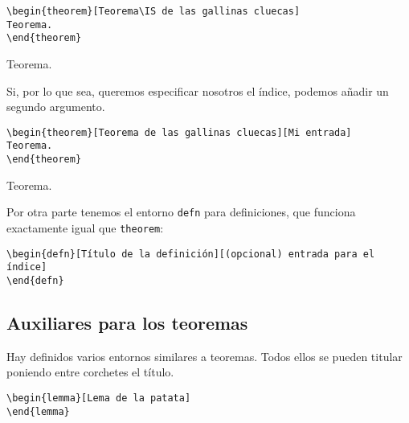 \documentclass[nochap]{apuntes}
\begin{document}
\begin{verbatim}
\begin{theorem}[Teorema\IS de las gallinas cluecas]
Teorema.
\end{theorem}
\end{verbatim}

\begin{theorem}
Teorema.
\end{theorem}

Si, por lo que sea, queremos especificar nosotros el índice, podemos añadir un segundo argumento.

\begin{verbatim}
\begin{theorem}[Teorema de las gallinas cluecas][Mi entrada]
Teorema.
\end{theorem}
\end{verbatim}

\begin{theorem}
Teorema.
\end{theorem}

Por otra parte tenemos el entorno \texttt{defn} para definiciones, que funciona exactamente igual que \texttt{theorem}:

\begin{verbatim}
\begin{defn}[Título de la definición][(opcional) entrada para el índice]
\end{defn}
\end{verbatim}

\begin{defn}
\end{defn}

\subsection{Auxiliares para los teoremas}

Hay definidos varios entornos similares a teoremas. Todos ellos se pueden titular poniendo entre corchetes el título.

\begin{verbatim}
\begin{lemma}[Lema de la patata]
\end{lemma}
\end{verbatim}

\begin{lemma}
\end{lemma}
\end{document}
